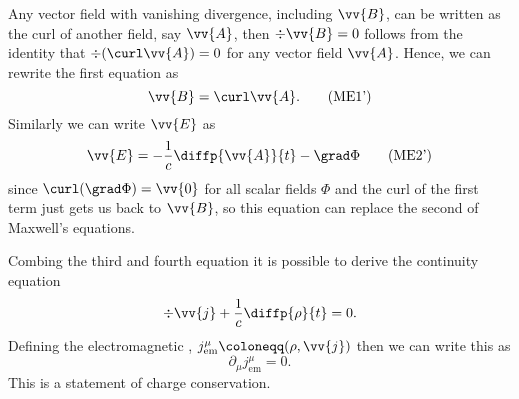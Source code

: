 \documentclass[fleqn]{NotesClass}
\newcommand{\EM}{\text{em}}
\begin{document}
\begin{appendices}
        Any vector field with vanishing divergence, including \(\vv{B}\), can be written as the curl of another field, say \(\vv{A}\), then \(\div\vv{B} = 0\) follows from the identity that \(\div(\curl \vv{A}) = 0\) for any vector field \(\vv{A}\).
        Hence, we can rewrite the first equation as
        \begin{equation}
            \vv{B} = \curl \vv{A}. \tag{ME1'}
        \end{equation}
        Similarly we can write \(\vv{E}\) as
        \begin{equation}
            \vv{E} = -\frac{1}{c}\diffp{\vv{A}}{t} - \grad \Phi \tag{ME2'}
        \end{equation}
        since \(\curl(\grad\Phi) = \vv{0}\) for all scalar fields \(\Phi\) and the curl of the first term just gets us back to \(\vv{B}\), so this equation can replace the second of Maxwell's equations.
        
        Combing the third and fourth equation it is possible to derive the continuity equation
        \begin{equation}
            \div\vv{j} + \frac{1}{c}\diffp{\rho}{t} = 0.
        \end{equation}
        Defining the electromagnetic , \(j_{\EM}^{\mu} \coloneqq (\rho, \vv{j})\) then we can write this as
        \begin{equation}
            \partial_\mu j_{\EM}^\mu = 0.
        \end{equation}
        This is a statement of charge conservation.
        

\end{appendices}
\end{document}

